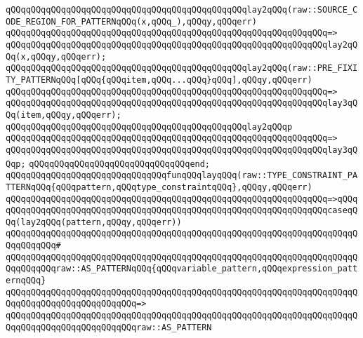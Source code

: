 \verb|qQQqqQQqqQQqqQQqqQQqqQQqqQQqqQQqqQQqqQQqqQQqqQQqlay2qQQq(raw::SOURCE_CODE_REGION_FOR_PATTERNqQQq(x,qQQq_),qQQqy,qQQqerr)|\newline
\verb|qQQqqQQqqQQqqQQqqQQqqQQqqQQqqQQqqQQqqQQqqQQqqQQqqQQqqQQqqQQqqQQq=>|\newline
\verb|qQQqqQQqqQQqqQQqqQQqqQQqqQQqqQQqqQQqqQQqqQQqqQQqqQQqqQQqqQQqqQQqlay2qQQq(x,qQQqy,qQQqerr);|\newline
\newline
\verb|qQQqqQQqqQQqqQQqqQQqqQQqqQQqqQQqqQQqqQQqqQQqqQQqlay2qQQq(raw::PRE_FIXITY_PATTERNqQQq[qQQq{qQQqitem,qQQq...qQQq}qQQq],qQQqy,qQQqerr)|\newline
\verb|qQQqqQQqqQQqqQQqqQQqqQQqqQQqqQQqqQQqqQQqqQQqqQQqqQQqqQQqqQQqqQQq=>|\newline
\verb|qQQqqQQqqQQqqQQqqQQqqQQqqQQqqQQqqQQqqQQqqQQqqQQqqQQqqQQqqQQqqQQqlay3qQQq(item,qQQqy,qQQqerr);|\newline
\newline
\verb|qQQqqQQqqQQqqQQqqQQqqQQqqQQqqQQqqQQqqQQqqQQqqQQqlay2qQQqp|\newline
\verb|qQQqqQQqqQQqqQQqqQQqqQQqqQQqqQQqqQQqqQQqqQQqqQQqqQQqqQQqqQQqqQQq=>|\newline
\verb|qQQqqQQqqQQqqQQqqQQqqQQqqQQqqQQqqQQqqQQqqQQqqQQqqQQqqQQqqQQqqQQqlay3qQQqp;|\newline
\verb|qQQqqQQqqQQqqQQqqQQqqQQqqQQqqQQqend;|\newline
\newline
\verb|qQQqqQQqqQQqqQQqqQQqqQQqqQQqqQQqfunqQQqlayqQQq(raw::TYPE_CONSTRAINT_PATTERNqQQq{qQQqpattern,qQQqtype_constraintqQQq},qQQqy,qQQqerr)|\newline
\verb|qQQqqQQqqQQqqQQqqQQqqQQqqQQqqQQqqQQqqQQqqQQqqQQqqQQqqQQqqQQqqQQq=>qQQq|\newline
\verb|qQQqqQQqqQQqqQQqqQQqqQQqqQQqqQQqqQQqqQQqqQQqqQQqqQQqqQQqqQQqqQQqcaseqQQq(lay2qQQq(pattern,qQQqy,qQQqerr))|\newline
\verb|qQQqqQQqqQQqqQQqqQQqqQQqqQQqqQQqqQQqqQQqqQQqqQQqqQQqqQQqqQQqqQQqqQQqqQQqqQQqqQQq#|\newline
\verb|qQQqqQQqqQQqqQQqqQQqqQQqqQQqqQQqqQQqqQQqqQQqqQQqqQQqqQQqqQQqqQQqqQQqqQQqqQQqqQQqraw::AS_PATTERNqQQq{qQQqvariable_pattern,qQQqexpression_patternqQQq}|\newline
\verb|qQQqqQQqqQQqqQQqqQQqqQQqqQQqqQQqqQQqqQQqqQQqqQQqqQQqqQQqqQQqqQQqqQQqqQQqqQQqqQQqqQQqqQQqqQQqqQQq=>|\newline
\verb|qQQqqQQqqQQqqQQqqQQqqQQqqQQqqQQqqQQqqQQqqQQqqQQqqQQqqQQqqQQqqQQqqQQqqQQqqQQqqQQqqQQqqQQqqQQqqQQqraw::AS_PATTERN|\newline
